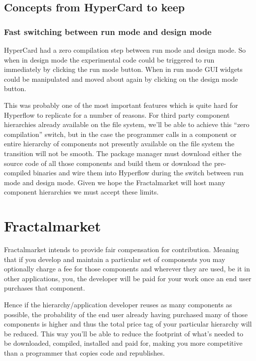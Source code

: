 \documentclass[%
 aip,
 jmp,%
 amsmath,amssymb,
 preprint,
 reprint,
 author-year,
 author-numerical,
]{revtex4-1}
\begin{document}
\subsection{\label{sec:Concepts from HyperCard to keep}Concepts from HyperCard to keep}
\subsubsection{\label{sec:Fast switching between run mode and design mode}Fast switching between run mode and design mode}

HyperCard had a zero compilation step between run mode and design mode. So when in design mode the experimental code could be triggered to run immediately by clicking the run mode button. When in run mode GUI widgets could be manipulated and moved about again by clicking on the design mode button.

This was probably one of the most important features which is quite hard for Hyperflow to replicate for a number of reasons. For third party component hierarchies already available on the file system, we'll be able to achieve this ``zero compilation'' switch, but in the case the programmer calls in a component or entire hierarchy of components not presently available on the file system the transition will not be smooth. The package manager must download either the source code of all those components and build them or download the pre-compiled binaries and wire them into Hyperflow during the switch between run mode and design mode. Given we hope the Fractalmarket will host many component hierarchies we must accept these limits.



\section{\label{sec:Fractalmarket}Fractalmarket}

Fractalmarket intends to provide fair compensation for contribution. Meaning that if you develop and maintain a particular set of components you may optionally charge a fee for those components and wherever they are used, be it in other applications, you, the developer will be paid for your work once an end user purchases that component.

Hence if the hierarchy/application developer reuses as many components as possible, the probability of the end user already having purchased many of those components is higher and thus the total price tag of your particular hierarchy will be reduced. This way you'll be able to reduce the footprint of what's needed to be downloaded, compiled, installed and paid for, making you more competitive than a programmer that copies code and republishes.
\end{document}
